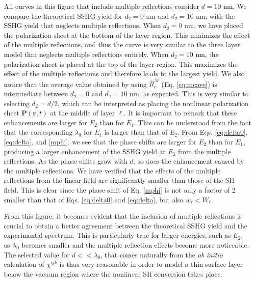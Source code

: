 All curves in this figure that include multiple reflections consider $d = 10$ nm. We compare the theoretical SSHG yield for $d_{2} = 0$ nm and $d_{2} = 10$ nm, with the SSHG yield that neglects multiple reflections. When $d_{2} = 0$ nm, we have placed the polarization sheet at the bottom of the layer region. This minimizes the effect of the multiple reflections, and thus the curve is very similar to the three layer model that neglects multiple reflections entirely. When $d_{2} = 10$ nm, the polarization sheet is placed at the top of the layer region. This maximizes the effect of the multiple reflections and therefore leads to the largest yield. We also notice that the average value obtained by using $\bar{R}^{M}_{i}$ (Eq. \eqref{eq:mcave}) is intermediate between $d_{2} = 0$ and $d_{2} = 10$ nm, as expected. This is very similar to selecting $d_{2} = d/2$, which can be interpreted as placing the nonlinear polarization sheet $\mathbf{P}(\mathbf{r},t)$ at the middle of layer $\ell$. It is important to remark that these enhancements are larger for $E_{2}$ than for $E_{1}$. This can be understood from the fact that the corresponding $\lambda_{0}$ for $E_{1}$ is larger than that of $E_{2}$. From Eqs. \eqref{eq:delta0}, \eqref{eq:delta}, and \eqref{mphi}, we see that the phase shifts are larger for $E_{2}$ than for $E_{1}$, producing a larger enhancement of the SSHG yield at $E_{2}$ from the multiple reflections. As the phase shifts grow with $d$, so does the enhancement caused by the multiple reflections. We have verified that the effects of the multiple reflections from the linear field are significantly smaller than those of the SH field. This is clear since the phase shift of Eq. \eqref{mphi} is not only a factor of 2 smaller than that of Eqs. \eqref{eq:delta0} and \eqref{eq:delta}, but also $w_\ell < W_\ell$.

From this figure, it becomes evident that the inclusion of multiple reflections is crucial to obtain a better agreement between the theoretical SSHG yield and the experimental spectrum. This is particularly true for larger energies, such as $E_{2}$, as $\lambda_{0}$ becomes smaller and the multiple reflection effects become more noticeable. The selected value for $d << \lambda_{0}$, that comes naturally from the \emph{ab initio} calculation of $\chi^{ijk}$ is thus very reasonable in order to model a thin surface layer below the vacuum region where the nonlinear SH conversion takes place.

